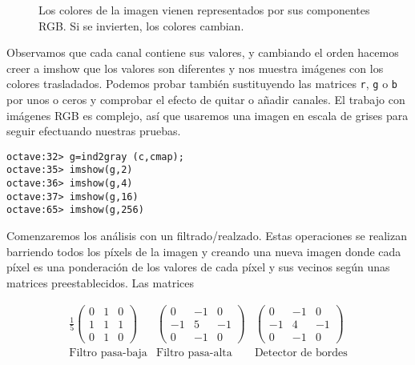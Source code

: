 \begin{figure}[htbp]
\centering
{}
\caption[Imagen en color cambiando las componentes RGB]%
{Los colores de la imagen vienen representados por sus componentes
RGB. Si se invierten, los colores cambian.}
\end{figure}

Observamos  que  cada  canal  contiene sus  valores,  y  cambiando  el
orden hacemos  creer a  imshow que  los valores  son diferentes  y nos
muestra imágenes  con los colores trasladados.  Podemos probar también
sustituyendo las matrices {\tt r}, {\tt g}  o {\tt b} por unos o ceros
y  comprobar el  efecto de  quitar o  añadir canales.  El trabajo  con
imágenes RGB  es complejo, así  que usaremos  una imagen en  escala de
grises para seguir efectuando nuestras pruebas.

\begin{verbatim}
octave:32> g=ind2gray (c,cmap);
octave:35> imshow(g,2)
octave:36> imshow(g,4)
octave:37> imshow(g,16)
octave:65> imshow(g,256)
\end{verbatim}


Comenzaremos los análisis con  un filtrado/realzado. Estas operaciones
se realizan  barriendo todos  los píxels  de la  imagen y  creando una
nueva imagen  donde cada píxel  es una  ponderación de los  valores de
cada  píxel y  sus vecinos  según unas  matrices preestablecidos.  Las
matrices

\[
\begin{array}{ccc}
\frac{1}{5}\left( \begin{array}{ccc}
0 & 1 & 0\\
1 & 1 & 1\\
0 & 1 & 0
\end{array}\right)  & \left( \begin{array}{ccc}
0 & -1 & 0\\
-1 & 5 & -1\\
0 & -1 & 0
\end{array}\right)  & \left( \begin{array}{ccc}
0 & -1 & 0\\
-1 & 4 & -1\\
0 & -1 & 0
\end{array}\right) \\
\textrm{Filtro pasa-baja} & \textrm{Filtro pasa-alta} & \textrm{Detector de bordes}
\end{array}\]

